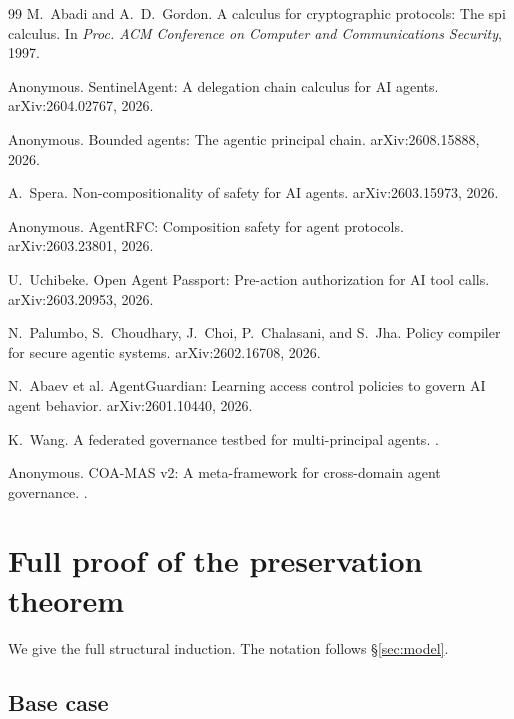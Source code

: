 \documentclass[11pt,a4paper]{article}
\theoremstyle{plain}
\theoremstyle{definition}
\theoremstyle{remark}
\begin{document}
\begin{thebibliography}{99}
M.~Abadi and A.~D.~Gordon.
\newblock A calculus for cryptographic protocols: The spi calculus.
\newblock In \emph{Proc. ACM Conference on Computer and Communications
Security}, 1997.

Anonymous.
\newblock SentinelAgent: A delegation chain calculus for AI agents.
\newblock arXiv:2604.02767, 2026.

Anonymous.
\newblock Bounded agents: The agentic principal chain.
\newblock arXiv:2608.15888, 2026.

A.~Spera.
\newblock Non-compositionality of safety for AI agents.
\newblock arXiv:2603.15973, 2026.

Anonymous.
\newblock AgentRFC: Composition safety for agent protocols.
\newblock arXiv:2603.23801, 2026.

U.~Uchibeke.
\newblock Open Agent Passport: Pre-action authorization for AI tool calls.
\newblock arXiv:2603.20953, 2026.

N.~Palumbo, S.~Choudhary, J.~Choi, P.~Chalasani, and S.~Jha.
\newblock Policy compiler for secure agentic systems.
\newblock arXiv:2602.16708, 2026.

N.~Abaev et al.
\newblock AgentGuardian: Learning access control policies to govern AI agent
behavior.
\newblock arXiv:2601.10440, 2026.

K.~Wang.
\newblock A federated governance testbed for multi-principal agents.
.

Anonymous.
\newblock COA-MAS v2: A meta-framework for cross-domain agent governance.
.

\end{thebibliography}

\appendix

\section{Full proof of the preservation theorem}
\label{app:proof}

We give the full structural induction. The notation follows \S\ref{sec:model}.

\subsection{Base case}
\end{document}
